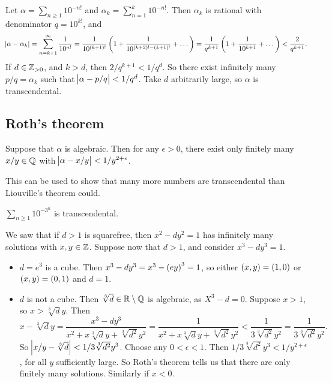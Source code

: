 \begin{example*}
Let $ \alpha = \sum_{n \ge 1} 10^{-n!} $ and $ \alpha_k = \sum_{n = 1}^k 10^{-n!} $. Then $ \alpha_k $ is rational with denominator $ q = 10^{k!} $, and
$$ \abs{\alpha - \alpha_k} = \sum_{n = k + 1}^\infty \dfrac{1}{10^{n!}} = \dfrac{1}{10^{\br{k + 1}!}}\br{1 + \dfrac{1}{10^{\br{k + 2}! - \br{k + 1}!}} + \dots} = \dfrac{1}{q^{k + 1}}\br{1 + \dfrac{1}{10^{k + 1}} + \dots} < \dfrac{2}{q^{k + 1}}. $$
If $ d \in \mathbb{Z}_{> 0} $, and $ k > d $, then $ 2 / q^{k + 1} < 1 / q^d $. So there exist infinitely many $ p / q = \alpha_k $ such that $ \abs{\alpha - p / q} < 1 / q^d $. Take $ d $ arbitrarily large, so $ \alpha $ is transcendental.
\end{example*}

\subsection{Roth's theorem}


\begin{theorem}
Suppose that $ \alpha $ is algebraic. Then for any $ \epsilon > 0 $, there exist only finitely many $ x / y \in \mathbb{Q} $ with $ \abs{\alpha - x / y} < 1 / y^{2 + \epsilon} $.
\end{theorem}

This can be used to show that many more numbers are transcendental than Liouville's theorem could.

\begin{example*}
$ \sum_{n \ge 1} 10^{-3^n} $ is transcendental.
\end{example*}

\begin{example*}
We saw that if $ d > 1 $ is squarefree, then $ x^2 - dy^2 = 1 $ has infinitely many solutions with $ x, y \in \mathbb{Z} $. Suppose now that $ d > 1 $, and consider $ x^3 - dy^3 = 1 $.
\begin{itemize}
\item $ d = e^3 $ is a cube. Then $ x^3 - dy^3 = x^3 - \br{ey}^3 = 1 $, so either $ \br{x, y} = \br{1, 0} $ or $ \br{x, y} = \br{0, 1} $ and $ d = 1 $.
\item $ d $ is not a cube. Then $ \sqrt[3]{d} \in \mathbb{R} \setminus \mathbb{Q} $ is algebraic, as $ X^3 - d = 0 $. Suppose $ x > 1 $, so $ x > \sqrt[3]{d}y $. Then
$$ x - \sqrt[3]{d}y = \dfrac{x^3 - dy^3}{x^2 + x\sqrt[3]{d}y + \sqrt[3]{d^2}y^2} = \dfrac{1}{x^2 + x\sqrt[3]{d}y + \sqrt[3]{d^2}y^2} < \dfrac{1}{3\sqrt[3]{d^2}y^2} = \dfrac{1}{3\sqrt[3]{d^2}y^2}. $$
So $ \abs{x / y - \sqrt[3]{d}} < 1 / 3\sqrt[3]{d^2}y^3 $. Choose any $ 0 < \epsilon < 1 $. Then $ 1 / 3\sqrt[3]{d^2}y^3 < 1 / y^{2 + \epsilon} $, for all $ y $ sufficiently large. So Roth's theorem tells us that there are only finitely many solutions. Similarly if $ x < 0 $.
\end{itemize}
\end{example*}

